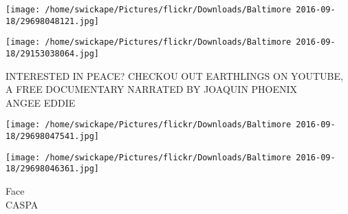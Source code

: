 \documentclass[10pt,letterpaper]{article}
\begin{document}
\texttt{[image: /home/swickape/Pictures/flickr/Downloads/Baltimore 2016-09-18/29698048121.jpg]}

\vspace{0.25in}
\texttt{[image: /home/swickape/Pictures/flickr/Downloads/Baltimore 2016-09-18/29153038064.jpg]}

INTERESTED IN PEACE?  CHECKOU OUT EARTHLINGS ON YOUTUBE, A FREE DOCUMENTARY NARRATED BY JOAQUIN PHOENIX\\
ANGEE EDDIE\\
\pagebreak

\texttt{[image: /home/swickape/Pictures/flickr/Downloads/Baltimore 2016-09-18/29698047541.jpg]}

\vspace{0.25in}
\texttt{[image: /home/swickape/Pictures/flickr/Downloads/Baltimore 2016-09-18/29698046361.jpg]}

Face\\
CASPA\\
\pagebreak
\end{document}
